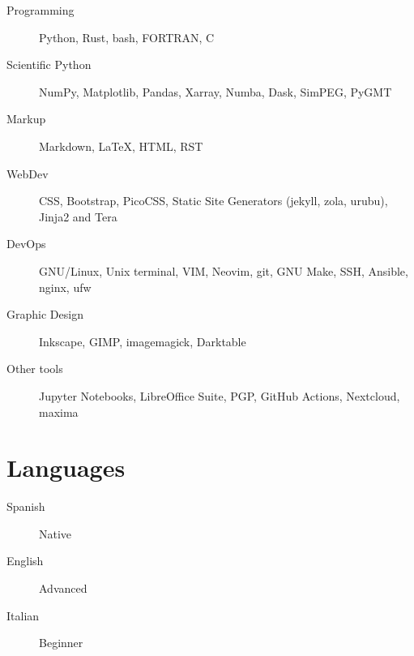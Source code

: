 \documentclass[11pt, letter]{article}
\begin{document}
\begin{description}
    \item[Programming] Python, Rust, bash, FORTRAN, C
    \item[Scientific Python] NumPy, Matplotlib, Pandas, Xarray, Numba, Dask,
        SimPEG, PyGMT
    \item[Markup] Markdown, LaTeX, HTML, RST
    \item[WebDev] CSS, Bootstrap, PicoCSS, Static Site Generators (jekyll,
        zola, urubu), Jinja2 and Tera
    \item[DevOps] GNU/Linux, Unix terminal, VIM, Neovim, git, GNU Make, SSH,
        Ansible, nginx, ufw
    \item[Graphic Design] Inkscape, GIMP, imagemagick, Darktable
    \item[Other tools] Jupyter Notebooks, LibreOffice Suite, PGP, GitHub
        Actions, Nextcloud, maxima
\end{description}

\section{Languages}

\begin{description}
    \item[Spanish] Native
    \item[English] Advanced
    \item[Italian] Beginner
\end{description}
\end{document}
